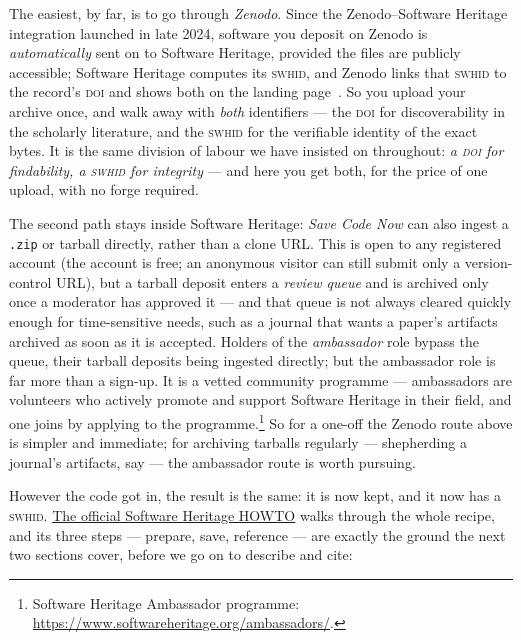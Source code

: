 The easiest, by far, is to go through \emph{Zenodo}. Since the Zenodo--Software Heritage
integration launched in late 2024, software you deposit on Zenodo is \emph{automatically} sent on
to Software Heritage, provided the files are publicly accessible; Software Heritage computes its
\textsc{swhid}, and Zenodo links that \textsc{swhid} to the record's \textsc{doi} and shows both on
the landing page~\autocite{zenodoswh2024}. So you upload your archive once, and walk away with
\emph{both} identifiers --- the \textsc{doi} for discoverability in the scholarly literature, and
the \textsc{swhid} for the verifiable identity of the exact bytes. It is the same division of
labour we have insisted on throughout: \emph{a \textsc{doi} for findability, a \textsc{swhid} for
integrity} --- and here you get both, for the price of one upload, with no forge required.

The second path stays inside Software Heritage: \emph{Save Code Now} can also ingest a \texttt{.zip}
or tarball directly, rather than a clone URL. This is open to any registered account (the account is
free; an anonymous visitor can still submit only a version-control URL), but a tarball deposit enters
a \emph{review queue} and is archived only once a moderator has approved it --- and that queue is not
always cleared quickly enough for time-sensitive needs, such as a journal that wants a paper's
artifacts archived as soon as it is accepted. Holders of the \emph{ambassador} role bypass the queue,
their tarball deposits being ingested directly; but the ambassador role is far more than a sign-up.
It is a vetted community programme --- ambassadors are volunteers who actively promote and support
Software Heritage in their field, and one joins by applying to the
programme.\footnote{Software Heritage Ambassador programme:
\url{https://www.softwareheritage.org/ambassadors/}.} So for a one-off the Zenodo route above is
simpler and immediate; for archiving tarballs regularly --- shepherding a journal's artifacts, say
--- the ambassador route is worth pursuing.

However the code got in, the result is the same: it is now kept, and it now has a \textsc{swhid}.
\href{https://www.softwareheritage.org/how-to-archive-reference-code/}{The official Software Heritage
HOWTO} walks through the whole recipe, and its three steps --- prepare, save, reference --- are
exactly the ground the next two sections cover, before we go on to describe and cite:

